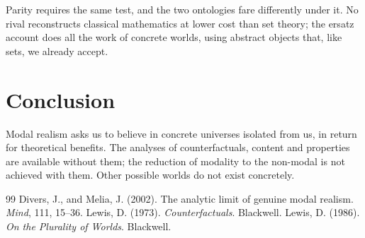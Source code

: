 \documentclass{situationist-preprint}
\begin{document}
\begin{reply}
Parity requires the same test, and the two ontologies fare differently under it. No rival reconstructs classical mathematics at lower cost than set theory; the ersatz account does all the work of concrete worlds, using abstract objects that, like sets, we already accept.
\end{reply}

\section{Conclusion}

Modal realism asks us to believe in concrete universes isolated from us, in return for theoretical benefits. The analyses of counterfactuals, content and properties are available without them; the reduction of modality to the non-modal is not achieved with them. Other possible worlds do not exist concretely.

\begin{thebibliography}{99}\small
{} Divers, J., and Melia, J. (2002). The analytic limit of genuine modal realism. \emph{Mind}, 111, 15--36.
 Lewis, D. (1973). \emph{Counterfactuals}. Blackwell.
 Lewis, D. (1986). \emph{On the Plurality of Worlds}. Blackwell.
\end{thebibliography}
\end{document}

